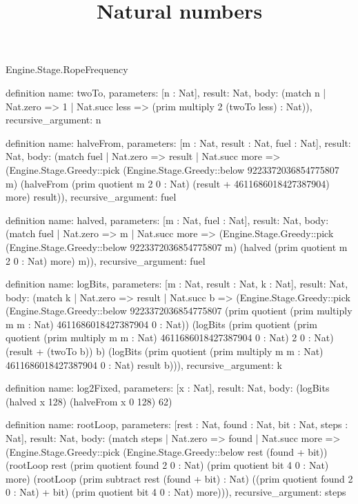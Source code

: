 \begin{lexlean}{Engine.Stage.RopeFrequency}
\title{Natural numbers}
\begin{semanticmodule}
definition{
  name: twoTo,
  parameters: [n : Nat],
  result: Nat,
  body: (match n | Nat.zero => 1 | Nat.succ less => (prim multiply 2 (twoTo less) : Nat)),
  recursive_argument: n
}

definition{
  name: halveFrom,
  parameters: [m : Nat, result : Nat, fuel : Nat],
  result: Nat,
  body: (match fuel
    | Nat.zero => result
    | Nat.succ more => (Engine.Stage.Greedy::pick (Engine.Stage.Greedy::below 9223372036854775807 m) (halveFrom (prim quotient m 2 0 : Nat) (result + 4611686018427387904) more) result)),
  recursive_argument: fuel
}

definition{
  name: halved,
  parameters: [m : Nat, fuel : Nat],
  result: Nat,
  body: (match fuel
    | Nat.zero => m
    | Nat.succ more => (Engine.Stage.Greedy::pick (Engine.Stage.Greedy::below 9223372036854775807 m) (halved (prim quotient m 2 0 : Nat) more) m)),
  recursive_argument: fuel
}

definition{
  name: logBits,
  parameters: [m : Nat, result : Nat, k : Nat],
  result: Nat,
  body: (match k
    | Nat.zero => result
    | Nat.succ b => (Engine.Stage.Greedy::pick (Engine.Stage.Greedy::below 9223372036854775807 (prim quotient (prim multiply m m : Nat) 4611686018427387904 0 : Nat)) (logBits (prim quotient (prim quotient (prim multiply m m : Nat) 4611686018427387904 0 : Nat) 2 0 : Nat) (result + (twoTo b)) b) (logBits (prim quotient (prim multiply m m : Nat) 4611686018427387904 0 : Nat) result b))),
  recursive_argument: k
}

definition{
  name: log2Fixed,
  parameters: [x : Nat],
  result: Nat,
  body: (logBits (halved x 128) (halveFrom x 0 128) 62)
}

definition{
  name: rootLoop,
  parameters: [rest : Nat, found : Nat, bit : Nat, steps : Nat],
  result: Nat,
  body: (match steps
    | Nat.zero => found
    | Nat.succ more => (Engine.Stage.Greedy::pick (Engine.Stage.Greedy::below rest (found + bit)) (rootLoop rest (prim quotient found 2 0 : Nat) (prim quotient bit 4 0 : Nat) more) (rootLoop (prim subtract rest (found + bit) : Nat) ((prim quotient found 2 0 : Nat) + bit) (prim quotient bit 4 0 : Nat) more))),
  recursive_argument: steps
}


\end{semanticmodule}
\end{lexlean}
